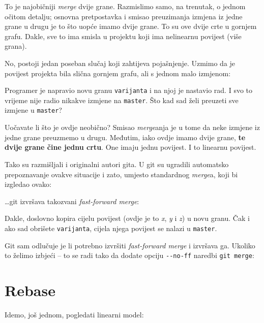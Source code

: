 

To je najobičniji \emph{merge} dvije grane.
Razmislimo samo, na trenutak, o jednom očitom detalju;
osnovna pretpostavka i smisao preuzimanja izmjena iz jedne grane u drugu je to što uopće imamo dvije grane.
To su ove dvije crte u gornjem grafu.
Dakle, sve to ima smisla u projektu koji ima nelinearnu povijest (više grana).

No, postoji jedan poseban slučaj koji zahtijeva pojašnjenje.
Uzmimo da je povijest projekta bila slična gornjem grafu, ali s jednom malo izmjenom:



Programer je napravio novu granu \verb+varijanta+ i na njoj je nastavio rad.
I svo to vrijeme nije radio nikakve izmjene na \verb+master+.
Što kad sad želi preuzeti sve izmjene u \verb+master+?

Uočavate li što je ovdje neobično?
Smisao \emph{merge}anja je u tome da neke izmjene iz jedne grane preuzmemo u drugu.
Međutim, iako ovdje imamo dvije grane, \textbf{te dvije grane čine jednu crtu}. 
One imaju jednu povijest. 
I to linearnu povijest.

Tako su razmišljali i originalni autori gita.
U git su ugradili automatsko prepoznavanje ovakve situacije i zato, umjesto standardnog \emph{merge}a, koji bi izgledao ovako:



\dots{}git izvršava takozvani \emph{fast-forward merge}:



Dakle, doslovno kopira cijelu povijest (ovdje je to \emph x, \emph y i \emph z) u novu granu.
Čak i ako sad obrišete \verb+varijanta+, cijela njega povijest se nalazi u \verb+master+.

Git sam odlučuje je li potrebno izvršiti \emph{fast-forward merge} i izvršava ga. Ukoliko to želimo izbjeći -- to se radi tako da dodate opciju \verb+--no-ff+ naredbi \verb+git merge+:


\section*{Rebase}

Idemo, još jednom, pogledati linearni model:



